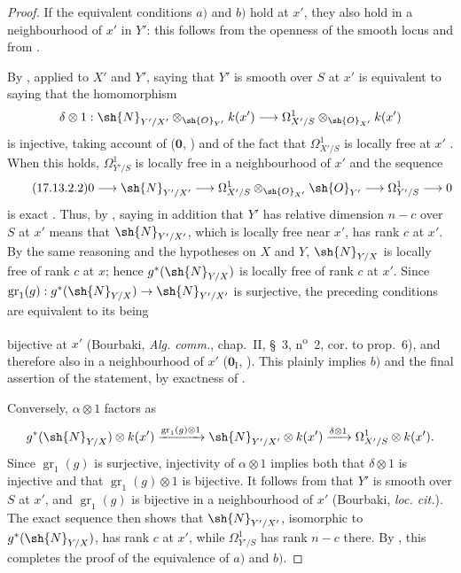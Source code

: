 \begin{proof}
If the equivalent conditions $a)$ and $b)$ hold at $x'$, they also hold in a neighbourhood of $x'$ in $Y'$: this follows from the openness of the smooth locus  and from .

By , applied to $X'$ and $Y'$, saying that $Y'$ is smooth over $S$ at $x'$ is equivalent to saying that the homomorphism
\[
  \delta\otimes1:
  \sh{N}_{Y'/X'}\otimes_{\sh{O}_{Y'}}k(x')
  \longrightarrow
  \Omega^1_{X'/S}\otimes_{\sh{O}_{X'}}k(x')
\]
is injective, taking account of ($\mathbf{0}$, ) and of the fact that $\Omega^1_{X'/S}$ is locally free at $x'$ .
When this holds, $\Omega^1_{Y'/S}$ is locally free in a neighbourhood of $x'$ and the sequence
\begin{equation}
\label{IV.17.13.2.2}
\tag{17.13.2.2}
  0\longrightarrow\sh{N}_{Y'/X'}
  \longrightarrow\Omega^1_{X'/S}\otimes_{\sh{O}_{X'}}\sh{O}_{Y'}
  \longrightarrow\Omega^1_{Y'/S}\longrightarrow0
\end{equation}
is exact .
Thus, by , saying in addition that $Y'$ has relative dimension $n-c$ over $S$ at $x'$ means that $\sh{N}_{Y'/X'}$, which is locally free near $x'$, has rank $c$ at $x'$.
By the same reasoning and the hypotheses on $X$ and $Y$, $\sh{N}_{Y/X}$ is locally free of rank $c$ at $x$; hence $g^*(\sh{N}_{Y/X})$ is locally free of rank $c$ at $x'$.
Since $\operatorname{gr}_1(g):g^*(\sh{N}_{Y/X})\to\sh{N}_{Y'/X'}$ is surjective, the preceding conditions are equivalent to its being


bijective at $x'$ (Bourbaki, \emph{Alg. comm.}, chap.~II, \S~3, n\textsuperscript{o}~2, cor. to prop.~6), and therefore also in a neighbourhood of $x'$ ($\mathbf{0}_{\mathrm I}$, ).
This plainly implies $b)$ and the final assertion of the statement, by exactness of .

Conversely, $\alpha\otimes1$ factors as
\[
  g^*(\sh{N}_{Y/X})\otimes k(x')
  \xrightarrow{\operatorname{gr}_1(g)\otimes1}
  \sh{N}_{Y'/X'}\otimes k(x')
  \xrightarrow{\delta\otimes1}
  \Omega^1_{X'/S}\otimes k(x').
\]
Since $\operatorname{gr}_1(g)$ is surjective, injectivity of $\alpha\otimes1$ implies both that $\delta\otimes1$ is injective and that $\operatorname{gr}_1(g)\otimes1$ is bijective.
It follows from  that $Y'$ is smooth over $S$ at $x'$, and $\operatorname{gr}_1(g)$ is bijective in a neighbourhood of $x'$ (Bourbaki, \emph{loc. cit.}).
The exact sequence  then shows that $\sh{N}_{Y'/X'}$, isomorphic to $g^*(\sh{N}_{Y/X})$, has rank $c$ at $x'$, while $\Omega^1_{Y'/S}$ has rank $n-c$ there.
By , this completes the proof of the equivalence of $a)$ and $b)$.


\end{proof}
